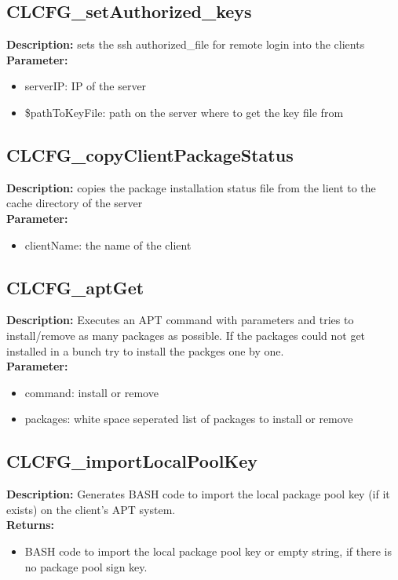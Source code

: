 \subsection{CLCFG\_setAuthorized\_keys}
\textbf{Description:} sets the ssh authorized\_file for remote login into the clients\\
\textbf{Parameter:}
\begin{itemize}
\item serverIP: IP of the server
\item \$pathToKeyFile: path on the server where to get the key file from
\end{itemize}

\subsection{CLCFG\_copyClientPackageStatus}
\textbf{Description:} copies the package installation status file from the lient to the cache directory of the server\\
\textbf{Parameter:}
\begin{itemize}
\item clientName: the name of the client
\end{itemize}

\subsection{CLCFG\_aptGet}
\textbf{Description:} Executes an APT command with parameters and tries to install/remove as many packages as possible. If the packages could not get installed in a bunch try to install the packges one by one.\\
\textbf{Parameter:}
\begin{itemize}
\item command: install or remove
\item packages: white space seperated list of packages to install or remove
\end{itemize}

\subsection{CLCFG\_importLocalPoolKey}
\textbf{Description:} Generates BASH code to import the local package pool key (if it exists) on the client's APT system.\\
\textbf{Returns:}
\begin{itemize}
\item BASH code to import the local package pool key or empty string, if there is no package pool sign key.
\end{itemize}

